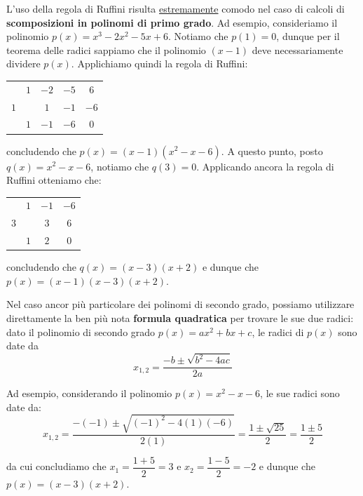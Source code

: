 \documentclass[a4paper, 12pt]{report}
\begin{document}
    \newpage

    L'uso della regola di Ruffini risulta \underline{estremamente} comodo nel caso di calcoli di \textbf{scomposizioni in polinomi di primo grado}. Ad esempio, consideriamo il polinomio $p(x) = x^3 - 2 x^2 - 5 x + 6$. Notiamo che $p(1) = 0$, dunque per il teorema delle radici sappiamo che il polinomio $(x-1)$ deve necessariamente dividere $p(x)$. Applichiamo quindi la regola di Ruffini:
    \begin{center}
        \begin{tabular}{c | c c c | c}
             & $1$ & $-2$ & $-5$ & $6$\\
        $1$ &       & $1$ & $-1$ & $-6$\\
        \hline
            & $1$ & $-1$ & $-6$ & $0$ \\
        \end{tabular}
    \end{center}

    concludendo che $p(x) = (x-1)(x^2-x-6)$. A questo punto, posto $q(x) = x^2-x-6$, notiamo che $q(3) = 0$. Applicando ancora la regola di Ruffini otteniamo che:
    
    \begin{center}
        \begin{tabular}{c | c c | c}
             & $1$ & $-1$ & $-6$\\
        $3$ &       & $3$ & $6$\\
        \hline
            & $1$ & $2$ & $0$ \\
        \end{tabular}
    \end{center}

    concludendo che $q(x) = (x-3)(x+2)$ e dunque che $p(x) = (x-1)(x-3)(x+2)$.

    Nel caso ancor più particolare dei polinomi di secondo grado, possiamo utilizzare direttamente la ben più nota \textbf{formula quadratica} per trovare le sue due radici: dato il polinomio di secondo grado $p(x) = ax^2+bx+c$, le radici di $p(x)$ sono date da
    \[x_{1,2} = \frac{-b \pm \sqrt{b^2-4ac}}{2a}\]

    Ad esempio, considerando il polinomio $p(x) = x^2-x-6$, le sue radici sono date da:
    \[x_{1,2} = \frac{-(-1) \pm \sqrt{(-1)^2 - 4(1)(-6)}}{2(1)} = \frac{1 \pm \sqrt{25}}{2} = \frac{1 \pm 5}{2}\]

    da cui concludiamo che $x_1 = \dfrac{1 + 5}{2} = 3$ e $x_2 = \dfrac{1 - 5}{2} = -2$ e dunque che $p(x) = (x-3)(x+2)$.
\end{document}
